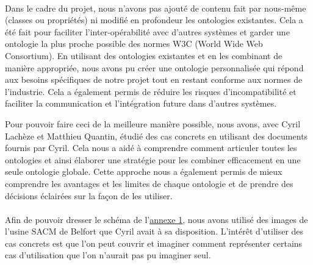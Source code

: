 \paragraph{} \hspace{10mm}
Dans le cadre du projet, nous n'avons pas ajouté de contenu fait par nous-même (classes ou propriétés) ni modifié en profondeur les ontologies existantes. Cela a été fait pour faciliter l'inter-opérabilité avec d'autres systèmes et garder une ontologie la plus proche possible des normes W3C (World Wide Web Consortium). En utilisant des ontologies existantes et en les combinant de manière appropriée, nous avons pu créer une ontologie personnalisée qui répond aux besoins spécifiques de notre projet tout en restant conforme aux normes de l'industrie. Cela a également permis de réduire les risques d'incompatibilité et faciliter la communication et l'intégration future dans d'autres systèmes.

Pour pouvoir faire ceci de la meilleure manière possible, nous avons, avec Cyril Lachèze et Matthieu Quantin, étudié des cas concrets en utilisant des documents fournis par Cyril. Cela nous a aidé à comprendre comment articuler toutes les ontologies et ainsi élaborer une stratégie pour les combiner efficacement en une seule ontologie globale. Cette approche nous a également permis de mieux comprendre les avantages et les limites de chaque ontologie et de prendre des décisions éclairées sur la façon de les utiliser.

\paragraph{} \hspace{10mm}
Afin de pouvoir dresser le schéma de l'\underline{\hyperref[annexe1]{annexe 1}}, nous avons utilisé des images de l'usine SACM de Belfort que Cyril avait à sa disposition. L'intérêt d'utiliser des cas concrets est que l'on peut couvrir et imaginer comment représenter certains cas d'utilisation que l'on n'aurait pas pu imaginer seul.

